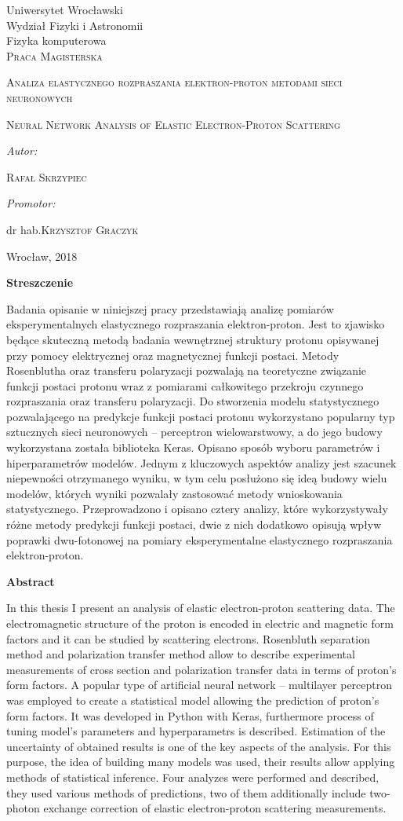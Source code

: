 \documentclass[11pt]{book}
\title{}
\author{Rafał Skrzypiec}
\makeatletter
\theoremstyle{definition}
\newcommand\blankpage{%
	\null
	\thispagestyle{empty}%
	\addtocounter{page}{0}%
	\newpage}
\renewcommand{\maketitle}{\begin{titlepage}
		
		
		
		\begin{center}
			{\Large Uniwersytet Wrocławski\\
				\vspace{0.cm}
				Wydział Fizyki i Astronomii\\
				\vspace{0.2cm}
				Fizyka komputerowa} \\
			\vspace{1.8cm}
			\LARGE \textsc{ Praca Magisterska}		
		\end{center}
		
		\vspace{3.5cm}
		
		\noindent
		
		\begin{center}		
			\huge \textsc{\@ Analiza elastycznego rozpraszania elektron-proton metodami sieci neuronowych}
			
			\vspace{0.5cm}
			
			\normalsize \textsc {Neural Network Analysis of Elastic Electron-Proton  Scattering}
			
		\end{center}
		
		
		
		\vspace{3cm}
		
		\begin{flushright}
			
			\begin{minipage}{5.5cm}
				
				\textit{\small Autor:}
				
				\normalsize \textsc{\@ Rafał Skrzypiec} \par
				
			\end{minipage}
			
			\vspace{1cm}
			
			
			\begin{minipage}{5.5cm}
				
				\textit{\small Promotor:}
				
				\hspace{0.2cm}dr hab.\textsc{\@ Krzysztof Graczyk} \par
				
			\end{minipage}
			
		\end{flushright}
		
		
		\vspace*{\stretch{4}}
		
		\begin{center}
			
			Wrocław, 2018
			
		\end{center}
		
	\end{titlepage}%
	
}
\makeatother
\begin{document}

\maketitle
\blankpage


\begin{center}
	{\large 	\textbf{Streszczenie}}

\end{center}
\normalsize 
	Badania opisanie w niniejszej pracy przedstawiają analizę pomiarów eksperymentalnych elastycznego rozpraszania elektron-proton. Jest to zjawisko będące skuteczną metodą badania wewnętrznej struktury protonu opisywanej przy pomocy elektrycznej oraz magnetycznej funkcji postaci. Metody Rosenblutha oraz transferu polaryzacji pozwalają na teoretyczne związanie funkcji postaci protonu wraz z pomiarami całkowitego przekroju czynnego rozpraszania oraz transferu polaryzacji. Do stworzenia modelu statystycznego pozwalającego na predykcje funkcji postaci protonu wykorzystano popularny typ sztucznych sieci neuronowych -- perceptron wielowarstwowy, a do jego budowy wykorzystana została biblioteka Keras. Opisano sposób wyboru parametrów i hiperparametrów modelów. Jednym z kluczowych aspektów analizy jest szacunek niepewności otrzymanego wyniku, w tym celu posłużono się ideą budowy wielu modelów, których wyniki pozwalały zastosować metody wnioskowania statystycznego. Przeprowadzono i opisano cztery analizy, które wykorzystywały różne metody predykcji funkcji postaci, dwie z nich dodatkowo opisują wpływ poprawki dwu-fotonowej na pomiary eksperymentalne elastycznego rozpraszania elektron-proton.

\vspace{2cm}

\begin{center}
	{\large 	\textbf{Abstract}}
\end{center}
\normalsize
In this thesis I present an analysis of elastic electron-proton scattering data. The electromagnetic structure of the proton is encoded in electric and magnetic form factors and it can be studied by scattering electrons. Rosenbluth separation method and polarization transfer method allow to describe experimental measurements of cross section and polarization transfer data in terms of proton's form factors. A popular type of artificial neural network -- multilayer perceptron was employed to create a statistical model allowing the prediction of proton's form factors. It was developed in Python with Keras, furthermore process of tuning model's parameters and hyperparametrs is described. Estimation of the uncertainty of obtained results is one of the key aspects of the analysis. For this purpose, the idea of building many models was used, their results allow applying methods of statistical inference. Four analyzes were performed and described, they used various methods of predictions, two of them additionally include two-photon exchange correction of elastic electron-proton scattering measurements.
\vspace{2cm}
\end{document}
